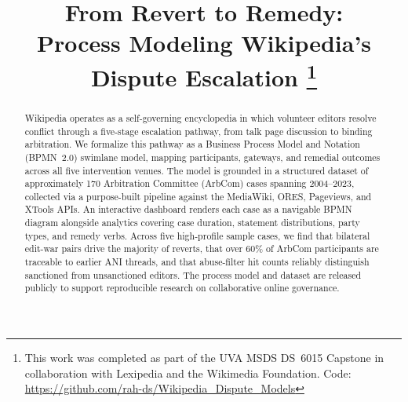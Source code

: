 \documentclass[conference]{IEEEtran}
\newcommand{\ghrepo}{\url{https://github.com/rah-ds/Wikipedia_Dispute_Models}}
\begin{document}
\title{From Revert to Remedy:\\Process Modeling Wikipedia's Dispute Escalation%
\thanks{This work was completed as part of the UVA MSDS DS~6015 Capstone
  in collaboration with Lexipedia and the Wikimedia Foundation.
  Code: \protect\ghrepo}
}

\author{
\and
{}
\and
{}
}

\maketitle

\begin{abstract}
Wikipedia operates as a self-governing encyclopedia in which volunteer editors
resolve conflict through a five-stage escalation pathway, from talk page
discussion to binding arbitration. We formalize this pathway as a Business
Process Model and Notation (BPMN~2.0) swimlane model, mapping participants,
gateways, and remedial outcomes across all five intervention venues. The model
is grounded in a structured dataset of approximately 170 Arbitration Committee
(ArbCom) cases spanning 2004--2023, collected via a purpose-built pipeline
against the MediaWiki, ORES, Pageviews, and XTools APIs. An interactive
dashboard renders each case as a navigable BPMN diagram alongside analytics
covering case duration, statement distributions, party types, and remedy
verbs. Across five high-profile sample cases, we find that bilateral edit-war
pairs drive the majority of reverts, that over 60\% of ArbCom participants
are traceable to earlier ANI threads, and that abuse-filter hit counts reliably
distinguish sanctioned from unsanctioned editors. The process model and dataset
are released publicly to support reproducible research on collaborative online
governance.
\end{abstract}
\end{document}
